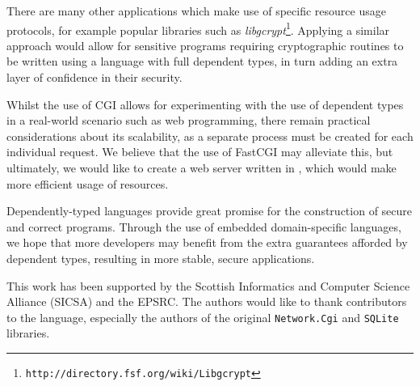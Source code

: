 \documentclass[preprint]{sigplanconf}
\begin{document}
There are many other applications which make use of specific resource usage protocols, for example popular libraries such as \textit{libgcrypt}\footnote{\texttt{http://directory.fsf.org/wiki/Libgcrypt}}. Applying a similar approach would allow for sensitive programs requiring cryptographic routines to be written using a language with full dependent types, in turn adding an extra layer of confidence in their security. 

Whilst the use of CGI allows for experimenting with the use of dependent types in a real-world scenario such as web programming, there remain practical considerations about its scalability, as a separate process must be created for each individual request. We believe that the use of FastCGI may alleviate this, but ultimately, we would like to create a web server written in \idris{}, which would make more efficient usage of resources. 

Dependently-typed languages provide great promise for the construction of secure and correct programs. Through the use of embedded domain-specific languages, we hope that more developers may benefit from the extra guarantees afforded by dependent types, resulting in more stable, secure applications.





\acks
This work has been supported by the Scottish Informatics and Computer Science Alliance (SICSA) and the EPSRC. The authors would like to thank contributors to the \idris{} language, especially the authors of the original \texttt{Network.Cgi} and \texttt{SQLite} libraries.






%
%
\end{document}
